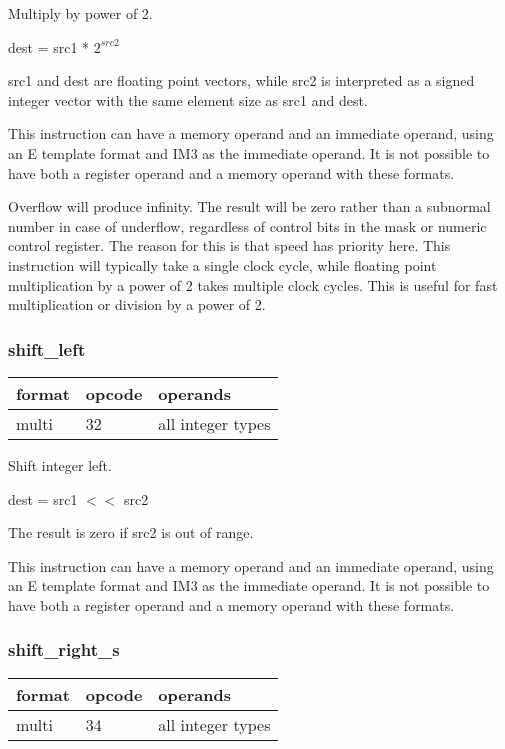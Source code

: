 \documentclass[forwardcom.tex]{subfiles}
\begin{document}
Multiply by power of 2.

dest = src1 * $2^{src2}$

src1 and dest are floating point vectors, while src2 is interpreted as a signed integer vector with the same element size as src1 and dest.
\vspace{2mm}

This instruction can have a memory operand and an immediate operand, using an E template format and IM3  as the immediate operand. It is not possible to have both a register operand and a memory operand with these formats.
\vspace{2mm}

Overflow will produce infinity. The result will be zero rather than a subnormal number in case of underflow, regardless of control bits in the mask or numeric control register. 
The reason for this is that
speed has priority here. This instruction will typically take a single clock cycle, while floating point multiplication by a power of 2 takes multiple clock cycles. 
This is useful for fast multiplication or division by a power of 2.


\subsubsection{shift\_left}
\label{table:shiftLeftInstruction}
\begin{tabular}{|p{12mm}|p{12mm}|p{110mm}|}
\hline
\bfseries format & \bfseries opcode & \bfseries operands \\ \hline
multi & 32 & all integer types \\ \hline
\end{tabular}
\vspace{2mm}

Shift integer left.

dest = src1 $<<$ src2
\vspace{2mm}

The result is zero if src2 is out of range.
\vspace{2mm}

This instruction can have a memory operand and an immediate operand, using an E template format and IM3  as the immediate operand. It is not possible to have both a register operand and a memory operand with these formats.
\vspace{2mm}

\subsubsection{shift\_right\_s}
\label{table:shiftRightSInstruction}
\begin{tabular}{|p{12mm}|p{12mm}|p{110mm}|}
\hline
\bfseries format & \bfseries opcode & \bfseries operands \\ \hline
multi & 34 & all integer types \\ \hline
\end{tabular}
\vspace{2mm}
\end{document}
